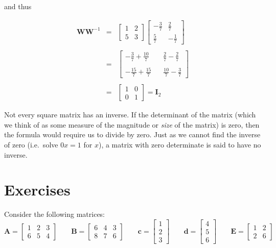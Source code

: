 \documentclass[]{book}
\theoremstyle{definition}
\theoremstyle{definition}
\theoremstyle{remark}
\begin{document}
and thus

\begin{eqnarray*}
\boldsymbol{W}\boldsymbol{W}^{-1} & = & \left[\begin{array}{cc}
1 & 2\\
5 & 3
\end{array}\right]\left[\begin{array}{cc}
-\frac{3}{7} & \frac{2}{7}\\
\frac{5}{7} & -\frac{1}{7}
\end{array}\right]\\
\\
 & = & \left[\begin{array}{cc}
-\frac{3}{7}+\frac{10}{7}\;\;\; & \frac{2}{7}-\frac{2}{7}\\
\\
-\frac{15}{7}+\frac{15}{7}\;\;\; & \frac{10}{7}-\frac{3}{7}
\end{array}\right]\\
\\
 & = & \left[\begin{array}{cc}
1 & 0\\
0 & 1
\end{array}\right]=\boldsymbol{I}_{2}
\end{eqnarray*}

Not every square matrix has an inverse. If the determinant of the matrix
(which we think of as some measure of the magnitude or \emph{size} of
the matrix) is zero, then the formula would require us to divide by
zero. Just as we cannot find the inverse of zero (i.e.~solve \(0x=1\)
for \(x\)), a matrix with zero determinate is said to have no inverse.

\section{Exercises}\label{exercises}

Consider the following matrices: \[
\mathbf{A}=\left[\begin{array}{ccc}
1 & 2 & 3\\
6 & 5 & 4
\end{array}\right]\;\;\;\;\;\;\;\mathbf{B}=\left[\begin{array}{ccc}
6 & 4 & 3\\
8 & 7 & 6
\end{array}\right]\;\;\;\;\;\;\;\mathbf{c}=\left[\begin{array}{c}
1\\
2\\
3
\end{array}\right]\;\;\;\;\;\;\;\mathbf{d}=\left[\begin{array}{c}
4\\
5\\
6
\end{array}\right]\;\;\;\;\;\;\;\mathbf{E}=\left[\begin{array}{cc}
1 & 2\\
2 & 6
\end{array}\right]
\]
\end{document}
